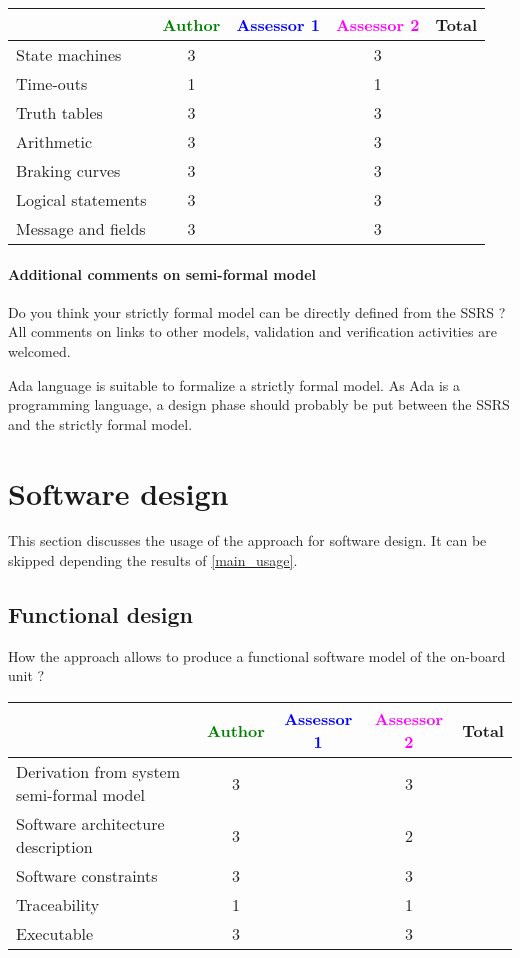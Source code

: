 \begin{tabular}{|l | c | c | c | c|}
\hline
& \textcolor{green}{Author} & \textcolor{blue}{Assessor 1} & \textcolor{magenta}{Assessor 2} & Total \\
\hline 
State machines  & 3    & & 3    &  \\
\hline
Time-outs  & 1    & & 1    &  \\
\hline
Truth tables  & 3    & & 3    &  \\
\hline
Arithmetic  & 3    & & 3    &  \\
\hline
Braking curves  & 3    & & 3    &  \\
\hline
Logical statements & 3    & & 3    &  \\
\hline
Message and fields & 3    & & 3    &  \\
\hline
\end{tabular}

\paragraph{Additional comments on semi-formal  model} Do you think your strictly formal  model can be directly defined from the SSRS ?
All comments on links to  other models, validation and verification activities are welcomed.

Ada language is suitable to formalize a strictly formal model. As Ada
is a programming language, a design phase should probably be put
between the SSRS and the strictly formal model.

\section{Software design}
This section discusses the usage of the approach for software design.
It can be skipped depending the results of \ref{main_usage}.

\subsection{Functional design}

How the approach allows to  produce a functional software model of the on-board unit ?

\begin{tabular}{|l | c | c | c | c|}
\hline
& \textcolor{green}{Author} & \textcolor{blue}{Assessor 1} & \textcolor{magenta}{Assessor 2} & Total \\
\hline
Derivation from system semi-formal model  & 3    & & 3    &  \\
\hline 
Software architecture description  & 3    & & 2    &  \\
\hline
Software constraints  & 3    & & 3    &  \\
\hline
Traceability  & 1    & & 1    &  \\
\hline
Executable  & 3    & & 3    &  \\
\hline
\end{tabular}

